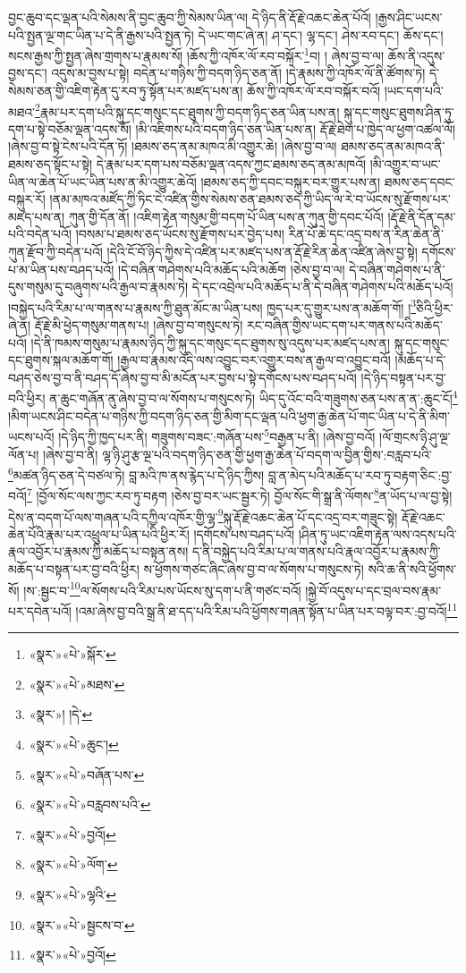 བྱང་ཆུབ་དང་ལྡན་པའི་སེམས་ནི་བྱང་ཆུབ་ཀྱི་སེམས་ཡིན་ལ། དེ་ཉིད་ནི་རྡོ་རྗེ་འཆང་ཆེན་པོའོ། །རྒྱས་ཤིང་ཡངས་པའི་སྤྱན་ལྔ་གང་ཡིན་པ་དེ་ནི་རྒྱས་པའི་སྤྱན་ཏེ། དེ་ཡང་གང་ཞེ་ན། ཤ་དང་། ལྷ་དང་། ཤེས་རབ་དང་། ཆོས་དང་། སངས་རྒྱས་ཀྱི་སྤྱན་ཞེས་གྲགས་པ་རྣམས་སོ། །ཆོས་ཀྱི་འཁོར་ལོ་རབ་བསྐོར་\footnote{«སྣར་»«པེ་»སྐོར་}བ། །
ཞེས་བྱ་བ་ལ། ཆོས་ནི་འདུས་བྱས་དང་། འདུས་མ་བྱས་པ་སྟེ། བདེན་པ་གཉིས་ཀྱི་བདག་ཉིད་ཅན་ནོ། །དེ་རྣམས་ཀྱི་འཁོར་ལོ་ནི་ཚོགས་ཏེ། དེ་སེམས་ཅན་གྱི་འཇིག་རྟེན་དུ་རབ་ཏུ་སྟོན་པར་མཛད་པས་ན། ཆོས་ཀྱི་འཁོར་ལོ་རབ་བསྐོར་བའོ། །ཡང་དག་པའི་མཐའ་\footnote{«སྣར་»«པེ་»མཐས་}རྣམ་པར་དག་པའི་སྐུ་དང་གསུང་དང་ཐུགས་ཀྱི་བདག་ཉིད་ཅན་ཡིན་པས་ན། སྐུ་དང་གསུང་ཐུགས་ཤིན་ཏུ་དག་པ་སྟེ་བཅོམ་ལྡན་འདས་སོ། །མི་འཇིགས་པའི་བདག་ཉིད་ཅན་ཡིན་པས་ན། རྡོ་རྗེ་ཐེག་པ་ཁྱེད་ལ་ཕྱག་འཚལ་ལོ། །ཞེས་བྱ་བ་སྟེ་ངེས་པའི་དོན་ཏོ། །ཐམས་ཅད་ནམ་མཁའ་མི་འགྱུར་ཆེ། །ཞེས་བྱ་བ་ལ། ཐམས་ཅད་ནམ་མཁའ་ནི་ཐམས་ཅད་སྟོང་པ་སྟེ། དེ་རྣམ་པར་དག་པས་བཅོམ་ལྡན་འདས་ཀྱང་ཐམས་ཅད་ནམ་མཁའོ། །མི་འགྱུར་བ་ཡང་ཡིན་ལ་ཆེན་པོ་ཡང་ཡིན་པས་ན་མི་འགྱུར་ཆེའོ། །ཐམས་ཅད་ཀྱི་དབང་བསྐུར་བར་གྱུར་པས་ན། ཐམས་ཅད་དབང་བསྐུར་རོ། །ནམ་མཁའ་མཛོད་ཀྱི་ཏིང་ངེ་འཛིན་གྱིས་སེམས་ཅན་ཐམས་ཅད་ཀྱི་ཡིད་ལ་རེ་བ་ཡོངས་སུ་རྫོགས་པར་མཛད་པས་ན། ཀུན་གྱི་དོན་ནོ། །འཇིག་རྟེན་གསུམ་གྱི་བདག་པོ་ཡིན་པས་ན་ཀུན་གྱི་དབང་པོའོ། །རྡོ་རྗེ་ནི་དོན་དམ་པའི་བདེན་པའོ། །བསམ་པ་ཐམས་ཅད་ཡོངས་སུ་རྫོགས་པར་བྱེད་པས། རིན་པོ་ཆེ་དང་འདྲ་བས་ན་རིན་ཆེན་ནི་ཀུན་རྫོབ་ཀྱི་བདེན་པའོ། །དེའི་ངོ་བོ་ཉིད་ཀྱིས་དེ་འཛིན་པར་མཛད་པས་ན་རྡོ་རྗེ་རིན་ཆེན་འཛིན་ཞེས་བྱ་སྟེ། དགོངས་པ་མ་ཡིན་པས་བཤད་པའོ། །དེ་བཞིན་གཤེགས་པའི་མཆོད་པའི་མཆོག །ཅེས་བྱ་བ་ལ། དེ་བཞིན་གཤེགས་པ་ནི་དུས་གསུམ་དུ་བཞུགས་པའི་རྒྱལ་བ་རྣམས་ཏེ། དེ་དང་འབྲེལ་པའི་མཆོད་པ་ནི་དེ་བཞིན་གཤེགས་པའི་མཆོད་པའོ། །བསྐྱེད་པའི་རིམ་པ་ལ་གནས་པ་རྣམས་ཀྱི་ཐུན་མོང་མ་ཡིན་པས། ཁྱད་པར་དུ་གྱུར་པས་ན་མཆོག་གོ། །\footnote{«སྣར་»། །དེ་}ཅིའི་ཕྱིར་ཞེ་ན། རྡོ་རྗེ་མི་ཕྱེད་གསུམ་གནས་པ། །ཞེས་བྱ་བ་གསུངས་ཏེ། རང་བཞིན་གྱིས་ཡང་དག་པར་གནས་པའི་མཆོད་པའོ། །དེ་ནི་ཁམས་གསུམ་པ་རྣམས་ཉིད་ཀྱི་སྐུ་དང་གསུང་དང་ཐུགས་སུ་འདུས་པར་མཛད་པས་ན། སྐུ་དང་གསུང་དང་ཐུགས་སྐལ་མཆོག་གོ། །རྒྱལ་བ་རྣམས་འདི་ལས་འབྱུང་བར་འགྱུར་བས་ན་རྒྱལ་བ་འབྱུང་བའོ། །མཆོད་པ་དེ་བཤད་ཅེས་བྱ་བ་ནི་བཤད་དོ་ཞེས་བྱ་བ་མི་མངོན་པར་བྱས་པ་སྟེ་དགོངས་པས་བཤད་པའོ། །དེ་ཉིད་བསྟན་པར་བྱ་བའི་ཕྱིར། ན་ཆུང་གཞོན་ནུ་ཞེས་བྱ་བ་ལ་སོགས་པ་གསུངས་ཏེ། ཡིད་དུ་འོང་བའི་གཟུགས་ཅན་པས་ན་ན་:ཆུང་ངོ།\footnote{«སྣར་»«པེ་»ཆུང་།} །མིག་ཡངས་ཤིང་བདེན་པ་གཉིས་ཀྱི་བདག་ཉིད་ཅན་གྱི་མིག་དང་ལྡན་པའི་ཕྱག་རྒྱ་ཆེན་པོ་གང་ཡིན་པ་དེ་ནི་མིག་ཡངས་པའོ། །དེ་ཉིད་ཀྱི་ཁྱད་པར་ནི། གཟུགས་བཟང་:གཞོན་པས་\footnote{«སྣར་»«པེ་»བཞོན་པས་}བརྒྱན་པ་ནི། །ཞེས་བྱ་བའོ། །ལོ་གྲངས་ཉི་ཤུ་ལྔ་ལོན་པ། །ཞེས་བྱ་བ་ནི། ལྷ་ཉི་ཤུ་རྩ་ལྔ་པའི་བདག་ཉིད་ཅན་གྱི་ཕྱག་རྒྱ་ཆེན་པོ་བདག་ལ་བྱིན་གྱིས་:བརླབ་པའི་\footnote{«སྣར་»«པེ་»བརླབས་པའི་}མཚན་ཉིད་ཅན་དེ་བཙལ་ཏེ། བླ་མའི་ཁ་ནས་རྙེད་པ་དེ་ཉིད་ཀྱིས། བླ་ན་མེད་པའི་མཆོད་པ་རབ་ཏུ་བརྟག་ཅིང་:བྱ་བའོ།\footnote{«སྣར་»«པེ་»བྱའོ།} །བྱོལ་སོང་ལས་ཀྱང་རབ་ཏུ་བརྟག །ཅེས་བྱ་བར་ཡང་སྦྱར་ཏེ། བྱོལ་སོང་གི་སྒྲ་ནི་ལོགས་\footnote{«སྣར་»«པེ་»ལོག་}ན་ཡོད་པ་ལ་བྱ་སྟེ། དེས་ན་བདག་པོ་ལས་གཞན་པའི་དཀྱིལ་འཁོར་གྱི་ལྷ་\footnote{«སྣར་»«པེ་»ལྷའི་}སྐུ་རྡོ་རྗེ་འཆང་ཆེན་པོ་དང་འདྲ་བར་གཟུང་སྟེ། རྡོ་རྗེ་འཆང་ཆེན་པོའི་རྣམ་པར་འཕྲུལ་པ་ཡིན་པའི་ཕྱིར་རོ། །དགོངས་པས་བཤད་པའོ། །ཤིན་ཏུ་ཡང་འཇིག་རྟེན་ལས་འདས་པའི་རྣལ་འབྱོར་པ་རྣམས་ཀྱི་མཆོད་པ་བསྟན་ནས། ད་ནི་བསྐྱེད་པའི་རིམ་པ་ལ་གནས་པའི་རྣལ་འབྱོར་པ་རྣམས་ཀྱི་མཆོད་པ་བསྟན་པར་བྱ་བའི་ཕྱིར། ས་ཕྱོགས་གཙང་ཞིང་ཞེས་བྱ་བ་ལ་སོགས་པ་གསུངས་ཏེ། སའི་ཆ་ནི་སའི་ཕྱོགས་སོ། །ས་:སྦྱང་བ་\footnote{«སྣར་»«པེ་»སྦྱངས་བ་}ལ་སོགས་པའི་རིམ་པས་ཡོངས་སུ་དག་པ་ནི་གཙང་བའོ། །སྐྱེ་བོ་འདུས་པ་དང་བྲལ་བས་རྣམ་པར་དབེན་པའོ། །འམ་ཞེས་བྱ་བའི་སྒྲ་ནི་ཐ་དད་པའི་རིམ་པའི་ཕྱོགས་གཞན་སྟོན་པ་ཡིན་པར་བལྟ་བར་:བྱ་བའོ།\footnote{«སྣར་»«པེ་»བྱའོ།} 
